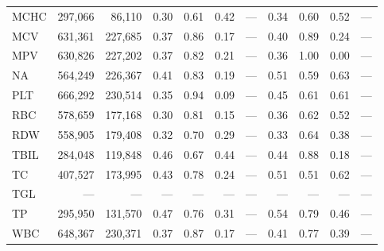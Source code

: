 \begin{table}[ht]
\begin{tabular}{lrrrrrrrrrr}
MCHC & 297,066 & 86,110 & 0.30 & 0.61 & 0.42 & --- & 0.34 & 0.60 & 0.52 & --- \\
MCV & 631,361 & 227,685 & 0.37 & 0.86 & 0.17 & --- & 0.40 & 0.89 & 0.24 & --- \\
MPV & 630,826 & 227,202 & 0.37 & 0.82 & 0.21 & --- & 0.36 & 1.00 & 0.00 & --- \\
NA & 564,249 & 226,367 & 0.41 & 0.83 & 0.19 & --- & 0.51 & 0.59 & 0.63 & --- \\
PLT & 666,292 & 230,514 & 0.35 & 0.94 & 0.09 & --- & 0.45 & 0.61 & 0.61 & --- \\
RBC & 578,659 & 177,168 & 0.30 & 0.81 & 0.15 & --- & 0.36 & 0.62 & 0.52 & --- \\
RDW & 558,905 & 179,408 & 0.32 & 0.70 & 0.29 & --- & 0.33 & 0.64 & 0.38 & --- \\
TBIL & 284,048 & 119,848 & 0.46 & 0.67 & 0.44 & --- & 0.44 & 0.88 & 0.18 & --- \\
TC & 407,527 & 173,995 & 0.43 & 0.78 & 0.24 & --- & 0.51 & 0.51 & 0.62 & --- \\
TGL & --- & --- & --- & --- & --- & --- & --- & --- & --- & --- \\
TP & 295,950 & 131,570 & 0.47 & 0.76 & 0.31 & --- & 0.54 & 0.79 & 0.46 & --- \\
WBC & 648,367 & 230,371 & 0.37 & 0.87 & 0.17 & --- & 0.41 & 0.77 & 0.39 & --- \\
\bottomrule
\end{tabular}
\label{tab:12_eval_detail_chs_ckd}
\end{table}